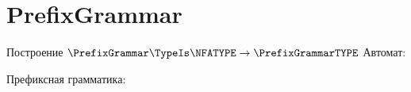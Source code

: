 \section{PrefixGrammar}
\begin{frame}{Построение $\PrefixGrammar\TypeIs\NFATYPE\to\PrefixGrammarTYPE$}
	Автомат:


	Префиксная грамматика:




\end{frame}
